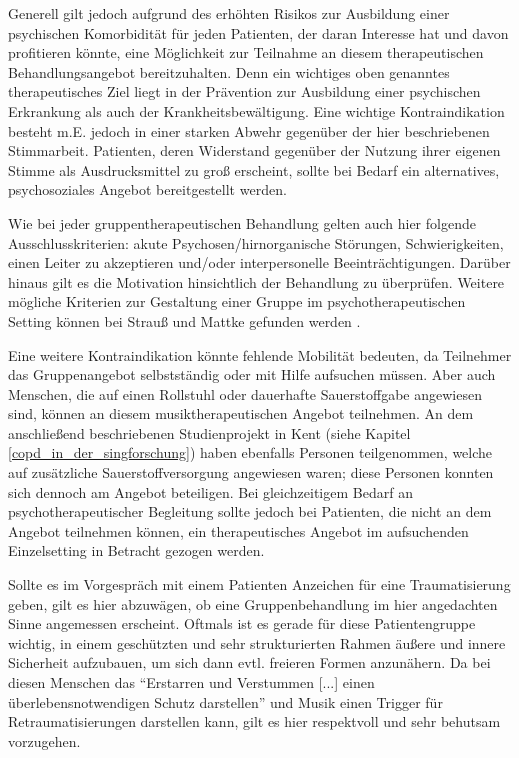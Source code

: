 Generell gilt jedoch aufgrund des erhöhten Risikos zur Ausbildung einer psychischen Komorbidität für jeden Patienten, der daran Interesse hat und davon profitieren könnte, eine Möglichkeit zur Teilnahme an diesem therapeutischen Behandlungsangebot bereitzuhalten. Denn ein wichtiges oben genanntes therapeutisches Ziel liegt in der Prävention zur Ausbildung einer psychischen Erkrankung als auch der Krankheitsbewältigung. Eine wichtige Kontraindikation besteht m.E. jedoch in einer starken Abwehr gegenüber der hier beschriebenen Stimmarbeit. Patienten, deren Widerstand gegenüber der Nutzung ihrer eigenen Stimme als Ausdrucksmittel zu groß erscheint, sollte bei Bedarf ein alternatives, psychosoziales Angebot bereitgestellt werden.

Wie bei jeder gruppentherapeutischen Behandlung gelten auch hier folgende Ausschlusskriterien: akute Psychosen/hirnorganische Störungen, Schwierigkeiten, einen Leiter zu akzeptieren und/oder interpersonelle Beeinträchtigungen. Darüber hinaus gilt es die Motivation hinsichtlich der Behandlung zu überprüfen. Weitere mögliche Kriterien zur Gestaltung einer Gruppe im psychotherapeutischen Setting können bei Strauß und Mattke gefunden werden \autocite[vgl.][78-88]{mattke2007}.

Eine weitere Kontraindikation könnte fehlende Mobilität bedeuten, da Teilnehmer das Gruppenangebot selbstständig oder mit Hilfe aufsuchen müssen. Aber auch Menschen, die auf einen Rollstuhl oder dauerhafte Sauerstoffgabe angewiesen sind, können an diesem musiktherapeutischen Angebot teilnehmen. An dem anschließend beschriebenen Studienprojekt in Kent (siehe Kapitel \ref{copd_in_der_singforschung}) haben ebenfalls Personen teilgenommen, welche auf zusätzliche Sauerstoffversorgung angewiesen waren; diese Personen konnten sich dennoch am Angebot beteiligen. Bei gleichzeitigem Bedarf an psychotherapeutischer Begleitung sollte jedoch bei Patienten, die nicht an dem Angebot teilnehmen können, ein therapeutisches Angebot im aufsuchenden Einzelsetting in Betracht gezogen werden.

Sollte es im Vorgespräch mit einem Patienten Anzeichen für eine Traumatisierung geben, gilt es hier abzuwägen, ob eine Gruppenbehandlung im hier angedachten Sinne angemessen erscheint. Oftmals ist es gerade für diese Patientengruppe wichtig, in einem geschützten und sehr strukturierten Rahmen äußere und innere Sicherheit aufzubauen, um sich dann evtl. freieren Formen anzunähern. Da bei diesen Menschen das "`Erstarren und Verstummen [...] einen überlebensnotwendigen Schutz darstellen"' \autocite[68]{rittner2012} und Musik einen Trigger für Retraumatisierungen darstellen kann, gilt es hier respektvoll und sehr behutsam vorzugehen.


